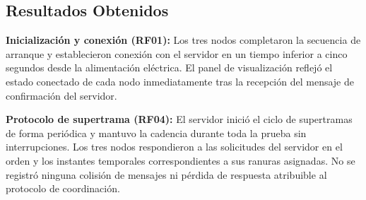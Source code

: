 \begin{table}[H]
\centering
{}
\caption{Requisitos funcionales evaluados en la Prueba~1.}
\label{tab:requisitos_prueba1}
\end{table}

\subsection{Resultados Obtenidos}

\textbf{Inicialización y conexión (RF01):} Los tres nodos completaron la secuencia de arranque y establecieron conexión con el servidor en un tiempo inferior a cinco segundos desde la alimentación eléctrica. El panel de visualización reflejó el estado conectado de cada nodo inmediatamente tras la recepción del mensaje de confirmación del servidor.

\textbf{Protocolo de supertrama (RF04):} El servidor inició el ciclo de supertramas de forma periódica y mantuvo la cadencia durante toda la prueba sin interrupciones. Los tres nodos respondieron a las solicitudes del servidor en el orden y los instantes temporales correspondientes a sus ranuras asignadas. No se registró ninguna colisión de mensajes ni pérdida de respuesta atribuible al protocolo de coordinación.

